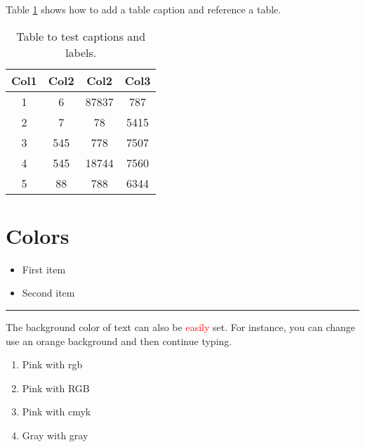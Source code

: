 \documentclass[12pt, a4paper]{article} %
\begin{document}
        Table \ref{table:data} shows how to add a table caption and reference a table.

        \begin{table}[h!]
            \centering
            \begin{tabular}{||c|c|c|c||}             %
                \hline                               %
                Col1 & Col2 & Col2 & Col3 \\ [0.5ex]
                \hline\hline
                1 & 6 & 87837 & 787 \\
                \hline
                2 & 7 & 78 & 5415 \\
                \hline
                3 & 545 & 778 & 7507 \\
                \hline
                4 & 545 & 18744 & 7560 \\
                \hline
                5 & 88 & 788 & 6344 \\ [1ex]
                \hline
            \end{tabular}
            \caption{Table to test captions and labels.}
            \label{table:data}
        \end{table}

    \section{Colors}
        \begin{itemize}
            \color{ForestGreen}
            \item First item
            \item Second item
        \end{itemize}

        \noindent
        {\color{RubineRed} \rule{\linewidth}{0.5mm}}

        The background color of text can also be \textcolor{red}{easily} set. For
        instance, you can change use an \colorbox{BurntOrange}{orange background} and then continue typing.

        \begin{enumerate}
            \item \textcolor{mypink1}{Pink with rgb}
            \item \textcolor{mypink2}{Pink with RGB}
            \item \textcolor{mypink3}{Pink with cmyk}
            \item \textcolor{mygray}{Gray with gray}
        \end{enumerate}
\end{document}
